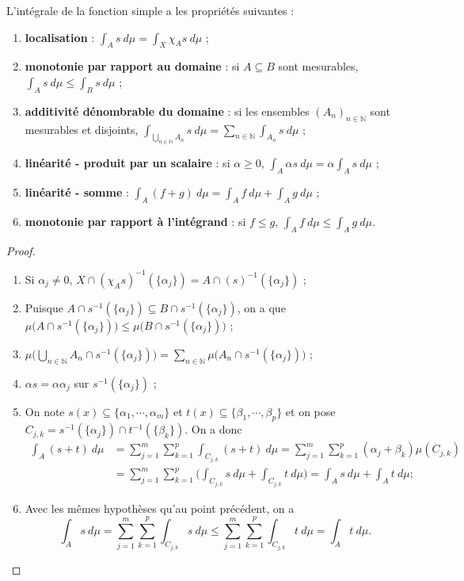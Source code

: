 L'intégrale de la fonction simple a les propriétés suivantes :
\begin{enumerate}[label=(\roman*)]
    \item \textbf{localisation} : $\int_As\ d\mu = \int_X \chi_As\ d\mu$ ;
    \item \textbf{monotonie par rapport au domaine} : si $A\subseteq B$ sont mesurables, $\int_As\ d\mu \leq \int_Bs\ d\mu$ ;
    \item \textbf{additivité dénombrable du domaine} : si les ensembles $(A_n)_{n\in\mathbb{N}}$ sont mesurables et disjoints, $\int_{\bigcup_{n\in\mathbb{N}}A_n}s\ d\mu = \sum_{n\in\mathbb{N}}\int_{A_n}s \ d\mu$ ;
    \item \textbf{linéarité - produit par un scalaire} : si $\alpha\geq0$, $\int_A\alpha s\ d\mu = \alpha\int_As\ d\mu$ ;
    \item \textbf{linéarité - somme} : $\int_A(f+g)\ d\mu = \int_Af\ d\mu+\int_Ag\ d\mu$ ;
    \item \textbf{monotonie par rapport à l'intégrand} : si $f\leq g$, $\int_Af\ d\mu \leq \int_Ag\ d\mu$.
\end{enumerate}
\begin{proof}
    \begin{enumerate}[label=(\roman*)]
        \item Si $\alpha_j\neq0$, $X\cap(\chi_As)^{-1}(\{\alpha_j\})=A\cap(s)^{-1}(\{\alpha_j\})$ ;
        \item Puisque $A\cap s^{-1}(\{\alpha_j\}) \subseteq B\cap s^{-1}(\{\alpha_j\})$, on a que $\mu\big(A\cap s^{-1}(\{\alpha_j\})\big)\leq\mu\big(B\cap s^{-1}(\{\alpha_j\})\big)$ ;
        \item $\mu\big(\bigcup_{n\in\mathbb{N}}A_n\cap s^{-1}(\{\alpha_j\})\big)=\sum_{n\in\mathbb{N}}\mu\big(A_n\cap s^{-1}(\{\alpha_j\})\big)$ ;
        \item $\alpha s = \alpha\alpha_j$ sur $s^{-1}(\{\alpha_j\})$ ;
        \item On note $s(x)\subseteq\{\alpha_1,\cdots,\alpha_m\}$ et $t(x)\subseteq\{\beta_1,\cdots,\beta_p\}$ et on pose $C_{j,k} = s^{-1}(\{\alpha_j\})\cap t^{-1}(\{\beta_k\})$. On a donc
        \begin{align*}
            \int_A(s+t)\ d\mu &= \sum_{j=1}^m \sum_{k=1}^p \int_{C_{j,k}}(s+t)\ d\mu = \sum_{j=1}^m \sum_{k=1}^p (\alpha_j+\beta_k)\mu(C_{j,k})\\
            &= \sum_{j=1}^m \sum_{k=1}^p \Big(\int_{C_{j,k}}s\ d\mu + \int_{C_{j,k}}t\ d\mu \Big) = \int_As\ d\mu + \int_At\ d\mu ;
        \end{align*}
        \item Avec les mêmes hypothèses qu'au point précédent, on a
        \begin{equation*}
            \int_As\ d\mu = \sum_{j=1}^m \sum_{k=1}^p\int_{C_{j,k}}s\ d\mu\leq \sum_{j=1}^m \sum_{k=1}^p\int_{C_{j,k}}t\ d\mu = \int_At\ d\mu.
        \end{equation*}
    \end{enumerate}
\end{proof}

